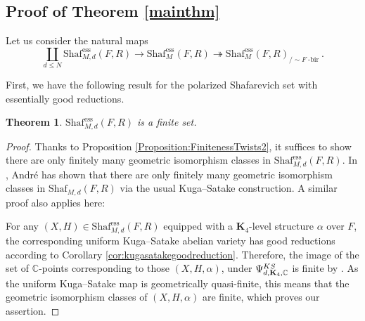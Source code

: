 \documentclass[11pt,reqno,oneside]{amsart}
\numberwithin{equation}{section}
\newtheorem{theorem}{Theorem}[section]
\theoremstyle{definition}
\DeclareMathOperator{\ess}{ess}
\newcommand{\KS}{{\rm KS}}
\newcommand{\Sha}{\mathrm{Shaf}}
\newcommand{\CC}{\mathbb{C}}
\DeclareMathOperator{\bir}{-bir}
\begin{document}
\subsection{Proof of Theorem \ref{mainthm}}
 Let us consider the natural maps
\begin{equation}\label{eq:essentialmaps}
\coprod_{d \leq N} \Sha^{\ess}_{M,d}(F,R) \to \Sha_M^{\ess}(F,R) \twoheadrightarrow \Sha_M^{\ess}(F,R)_{\slash \sim F\!\bir}.
\end{equation}

First, we have the following result for the polarized Shafarevich set with essentially good reductions.
\begin{theorem}\label{thmpol}
$\Sha_{M,d}^{\ess}(F,R)$ is a finite set.
\end{theorem}
\begin{proof}
Thanks to Proposition  \ref{Proposition:FinitenessTwists2},  it suffices to show there are only finitely many geometric isomorphism classes in  $\Sha^{\ess}_{M,d}(F,R)$.  In \cite[Section 9.4]{A96}, Andr\'e has  shown that  there are only finitely many geometric isomorphism classes  in $\Sha_{M,d}(F,R)$ via the usual Kuga--Satake construction. A similar proof also applies here:

For any $(X,H) \in \Sha^{\ess}_{M,d}(F,R)$ equipped with a $\mathbf{K}_4$-level structure $\alpha$ over $F$, the corresponding uniform Kuga--Satake abelian variety has good reductions  according to Corollary \ref{cor:kugasatakegoodreduction}. Therefore, the image of the set of $\mathbb{C}$-points corresponding to those $(X,H,\alpha)$, under $\Psi_{d,\mathbf{K}_4,\CC}^{\KS}$ is finite by \cite[VI, \S1, Theorem 2]{Faltings1992}. As the uniform Kuga--Satake map is geometrically quasi-finite, this means that the geometric isomorphism classes of $(X,H,\alpha)$ are finite, which proves our assertion. 
\end{proof}
\end{document}

